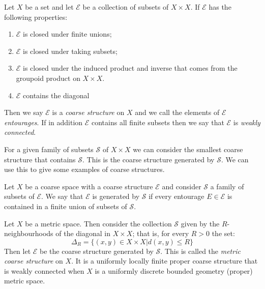 \begin{conjecture}
{\begin{definition}
Let $X$ be a set and let $\mathcal{E}$ be a collection of subsets of $X \times X$. If $\mathcal{E}$ has the following properties:
\begin{enumerate}
\item $\mathcal{E}$ is closed under finite unions;
\item $\mathcal{E}$ is closed under taking subsets;
\item $\mathcal{E}$ is closed under the induced product and inverse that comes from the groupoid product on $X \times X$.
\item $\mathcal{E}$ contains the diagonal
\end{enumerate}
Then we say $\mathcal{E}$ is a \textit{coarse structure} on $X$ and we call the elements of $\mathcal{E}$ \textit{entourages}. If in addition $\mathcal{E}$ contains all finite subsets then we say that $\mathcal{E}$ is \textit{weakly connected}.
\end{definition}

For a given family of subsets $\mathcal{S}$ of $X \times X$ we can consider the smallest coarse structure that contains $\mathcal{S}$. This is the coarse structure generated by $\mathcal{S}$. We can use this to give some examples of coarse structures.

\begin{definition}
Let $X$ be a coarse space with a coarse structure $\mathcal{E}$ and consider $\mathcal{S}$ a family of subsets of $\mathcal{E}$. We say that $\mathcal{E}$ is generated by $\mathcal{S}$ if every entourage $E \in \mathcal{E}$ is contained in a finite union of subsets of $\mathcal{S}$.
\end{definition}

\begin{example}\label{ex:MCS}
Let $X$ be a metric space. Then consider the collection $\mathcal{S}$ given by the $R$-neighbourhoods of the diagonal in $X\times X$; that is, for every $R>0$ the set:
\begin{equation*}
\Delta_{R}=\lbrace (x,y) \in X \times X | d(x,y)\leq R \rbrace
\end{equation*}
Then let $\mathcal{E}$ be the coarse structure generated by $\mathcal{S}$. This is called the \textit{metric coarse structure} on $X$. It is a uniformly locally finite proper coarse structure that is weakly connected when $X$ is a uniformly discrete bounded geometry (proper) metric space.
\end{example}

}
\end{conjecture}
